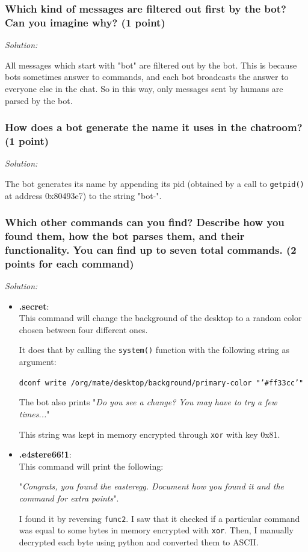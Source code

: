 \documentclass[a4paper,11pt]{article}
\newenvironment{solution}%
{\par{\noindent\small\textit{Solution:}}\vspace{-12pt}\begin{framed}}%
{\end{framed}\par}
\begin{document}
\subsubsection*{Which kind of messages are filtered out first by the bot? Can
you imagine why? \ifsolution (1 point) \fi}

\ifsolution
\begin{solution}
	All messages which start with "bot" are filtered out by the bot.
	This is because bots sometimes answer to commands, and each bot broadcasts the answer to everyone else in the chat.
	So in this way, only messages sent by humans are parsed by the bot.
\end{solution}\fi


\subsubsection*{How does a bot generate the name it uses in the chatroom? \ifsolution (1 point) \fi}
\ifsolution
\begin{solution}
	The bot generates its name by appending its pid (obtained by a call to \texttt{getpid()} at address 0x80493e7) to the string "bot-".
\end{solution}\fi

\subsubsection*{Which other commands can you find? Describe how you found them,
how the bot parses them, and their functionality. You can find up to seven total commands.
\ifsolution (2 points for each command) \fi}

\ifsolution
\begin{solution}
\begin{itemize}
\item \textbf{.secret}: \\
	This command will change the background of the desktop to a random color chosen between four different ones.

	It does that by calling the \texttt{system()} function with the following string as argument:

	\texttt{dconf write /org/mate/desktop/background/primary-color  "'\#ff33cc'"}

	The bot also prints "\textit{Do you see a change? You may have to try a few times...}"

	This string was kept in memory encrypted through \texttt{xor} with key 0x81.

\item \textbf{.e4stere66!1}:\\
	This command will print the following:

	"\textit{Congrats, you found the easteregg. Document how you found it and the command for extra points}".

	I found it by reversing \texttt{func2}. I saw that it checked if a particular command was equal to some
	bytes in memory encrypted with \texttt{xor}. Then, I manually decrypted each byte using python
	and converted them to ASCII.
\end{itemize}
\end{solution}\fi
\end{document}
